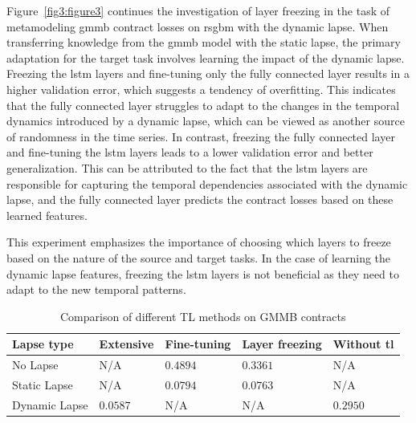 Figure~\ref{fig3:figure3} continues the investigation of layer freezing in the task of metamodeling \gls{gmmb} contract losses on \gls{rsgbm} with the dynamic lapse. 
When transferring knowledge from the \gls{gmmb} model with the static lapse, the primary adaptation for the target task involves learning the impact of the dynamic lapse.
Freezing the \gls{lstm} layers and fine-tuning only the fully connected layer results in a higher validation error, which suggests a tendency of overfitting.
This indicates that the fully connected layer struggles to adapt to the changes in the temporal dynamics introduced by a dynamic lapse, which can be viewed as another source of randomness in the time series.
In contrast, freezing the fully connected layer and fine-tuning the \gls{lstm} layers leads to a lower validation error and better generalization. 
This can be attributed to the fact that the \gls{lstm} layers are responsible for capturing the temporal dependencies associated with the dynamic lapse, and the fully connected layer predicts the contract losses based on these learned features.

This experiment emphasizes the importance of choosing which layers to freeze based on the nature of the source and target tasks. 
In the case of learning the dynamic lapse features, freezing the \gls{lstm} layers is not beneficial as they need to adapt to the new temporal patterns.

\begin{table}[ht!]
    \centering
    \begin{tabular}{lllll}
    \toprule
    \textbf{Lapse type} & \textbf{Extensive} & \textbf{Fine-tuning} & \textbf{Layer freezing} & \textbf{Without \gls{tl}} \\
    \midrule
    No Lapse & N/A & $0.4894$ & $0.3361$ & N/A \\
    Static Lapse & N/A & $0.0794$ & $0.0763$ & N/A \\
    Dynamic Lapse & $0.0587$ &  N/A &  N/A & $0.2950$ \\
    \bottomrule
    \end{tabular}
    \caption{Comparison of different TL methods on GMMB contracts}
    \label{tab3:transfer_learning_results}
\end{table}

